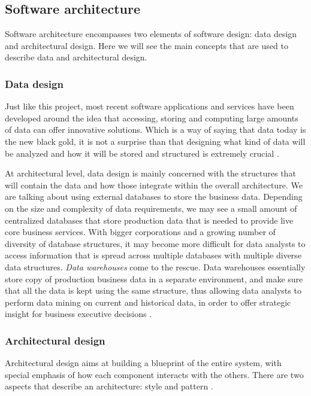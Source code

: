 \subsection{Software architecture}
Software architecture encompasses two elements of software design: data design
and architectural design. Here we will see the main concepts that are used to
describe data and architectural design.

\subsubsection{Data design}
Just like this project, most recent software applications and services have been
developed around the idea that accessing, storing and computing large amounts of
data can offer innovative solutions. Which is a way of saying that data today is
the new black gold, it is not a surprise than that designing what kind of data
will be analyzed and how it will be stored and structured is extremely crucial
\cite{RP05}.

At architectural level, data design is mainly concerned with the structures that
will contain the data and how those integrate within the overall architecture.
We are talking about using external databases to store the business data.
Depending on the size and complexity of data requirements, we may see a small
amount of centralized databases that store production data that is needed to
provide live core business services. With bigger corporations and a growing
number of diversity of database structures, it may become more difficult for
data analysts to access information that is spread across multiple databases
with multiple diverse data structures. \emph{Data warehouses} come to the
rescue. Data warehouses essentially store copy of production business data in a
separate environment, and make sure that all the data is kept using the same
structure, thus allowing data analysts to perform data mining on current and
historical data, in order to offer strategic insight for business
executive decisions \cite{RM96}.

\subsubsection{Architectural design}
Architectural design aims at building a blueprint of the entire system, with
special emphasis of how each component interacts with the others. There are two
aspects that describe an architecture: style and pattern \cite{RP05}.

